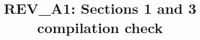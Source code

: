 \documentclass[11pt,reqno]{amsart}
\theoremstyle{plain}
\theoremstyle{definition}
\theoremstyle{remark}
\numberwithin{equation}{section}
\begin{document}
\title{REV\_A1: Sections 1 and 3 compilation check}
\date{}
\maketitle

\setcounter{section}{2}

\end{document}
